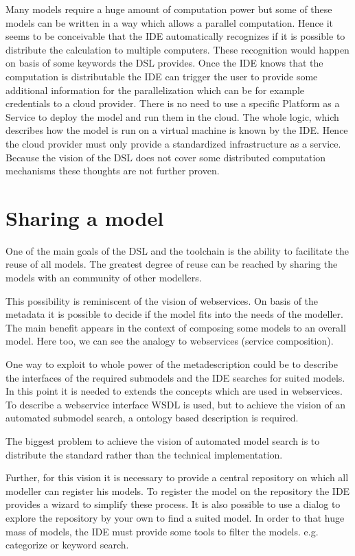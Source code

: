 Many models require a huge amount of computation power but some of these models can be written in a way which allows a parallel computation. Hence it seems to be conceivable that the IDE automatically recognizes if it is possible to distribute the calculation to multiple computers. These recognition would happen on basis of some keywords the DSL provides. Once the IDE knows that the computation is distributable the IDE can trigger the user to provide some additional information for the parallelization which can be for example credentials to a cloud provider. There is no need to use a specific Platform as a Service to deploy the model and run them in the cloud. The whole logic, which describes how the model is run on a virtual machine is known by the IDE. Hence the cloud provider must only provide a standardized infrastructure as a service. Because the vision of the DSL does not cover some distributed computation mechanisms these thoughts are not further proven.


\section{Sharing a model}

One of the main goals of the DSL and the toolchain is the ability to facilitate the reuse of all models. The greatest degree of reuse can be reached by sharing the models with an community of other modellers.


This possibility is reminiscent of the vision of webservices. On basis of the metadata it is possible to decide if the model fits into the needs of the modeller. The main benefit appears in the context of composing some models to an overall model. Here too, we can see the analogy to webservices (service composition).


One way to exploit to whole power of the metadescription could be to describe the interfaces of the required submodels and the IDE searches for suited models. In this point it is needed to extends the concepts which are used in webservices. To describe a webservice interface WSDL is used, but to achieve the vision of an automated submodel search, a ontology based description is required.


The biggest problem to achieve the vision of automated model search is to distribute the standard rather than the technical implementation.


Further, for this vision it is necessary to provide a central repository on which all modeller can register his models. To register the model on the repository the IDE provides a wizard to simplify these process. It is also possible to use a dialog to explore the repository by your own to find a suited model. In order to that huge mass of models, the IDE must provide some tools to filter the models. e.g. categorize or keyword search.
